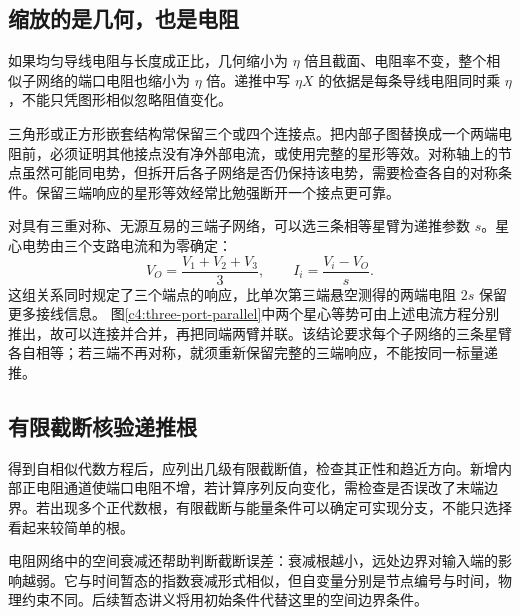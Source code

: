 \subsection{缩放的是几何，也是电阻}

如果均匀导线电阻与长度成正比，几何缩小为 $\eta$ 倍且截面、电阻率不变，整个相似子网络的端口电阻也缩小为 $\eta$ 倍。递推中写 $\eta X$ 的依据是每条导线电阻同时乘 $\eta$，不能只凭图形相似忽略阻值变化。

三角形或正方形嵌套结构常保留三个或四个连接点。把内部子图替换成一个两端电阻前，必须证明其他接点没有净外部电流，或使用完整的星形等效。对称轴上的节点虽然可能同电势，但拆开后各子网络是否仍保持该电势，需要检查各自的对称条件。保留三端响应的星形等效经常比勉强断开一个接点更可靠。


对具有三重对称、无源互易的三端子网络，可以选三条相等星臂为递推参数 $s$。星心电势由三个支路电流和为零确定：
\[
 V_O=\frac{V_1+V_2+V_3}{3},\qquad I_i=\frac{V_i-V_O}{s}.
\]
这组关系同时规定了三个端点的响应，比单次第三端悬空测得的两端电阻 $2s$ 保留更多接线信息。
图\ref{c4:three-port-parallel}中两个星心等势可由上述电流方程分别推出，故可以连接并合并，再把同端两臂并联。该结论要求每个子网络的三条星臂各自相等；若三端不再对称，就须重新保留完整的三端响应，不能按同一标量递推。

\subsection{有限截断核验递推根}

得到自相似代数方程后，应列出几级有限截断值，检查其正性和趋近方向。新增内部正电阻通道使端口电阻不增，若计算序列反向变化，需检查是否误改了末端边界。若出现多个正代数根，有限截断与能量条件可以确定可实现分支，不能只选择看起来较简单的根。

电阻网络中的空间衰减还帮助判断截断误差：衰减根越小，远处边界对输入端的影响越弱。它与时间暂态的指数衰减形式相似，但自变量分别是节点编号与时间，物理约束不同。后续暂态讲义将用初始条件代替这里的空间边界条件。


